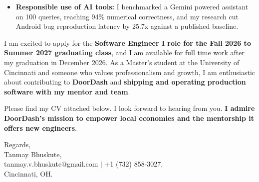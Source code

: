 \documentclass[11pt]{letter}
\begin{document}
\begin{letter}{}
\begin{itemize}[leftmargin=*, itemsep=0.45em]
    \item \textbf{Responsible use of AI tools:} I benchmarked a Gemini powered assistant on 100 queries, reaching 94\% numerical correctness, and my research cut Android bug reproduction latency by 25.7x against a published baseline.
\end{itemize}

I am excited to apply for the \textbf{Software Engineer I role for the Fall 2026 to Summer 2027 graduating class}, and I am available for full time work after my graduation in December 2026. As a Master's student at the University of Cincinnati and someone who values professionalism and growth, I am enthusiastic about contributing to \textbf{DoorDash} and \textbf{shipping and operating production software with my mentor and team}.

Please find my CV attached below. I look forward to hearing from you. \textbf{I admire DoorDash's mission to empower local economies and the mentorship it offers new engineers}.

{\setlength{\parskip}{0pt}
Regards,\\
Tanmay Bhuskute,\\
tanmay.v.bhuskute@gmail.com $\mid$ +1 (732) 858-3027,\\
Cincinnati, OH.
}

\end{letter}
\end{document}
